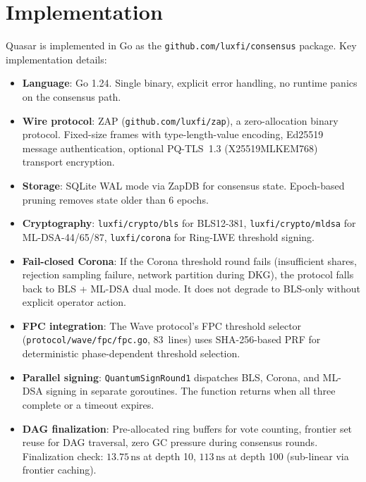 \section{Implementation}

\label{sec:implementation}

Quasar is implemented in Go as the \texttt{github.com/luxfi/consensus}
package. Key implementation details:

\begin{itemize}[leftmargin=2em]
\item \textbf{Language}: Go 1.24. Single binary, explicit error handling,
      no runtime panics on the consensus path.
\item \textbf{Wire protocol}: ZAP (\texttt{github.com/luxfi/zap}), a
      zero-allocation binary protocol. Fixed-size frames with type-length-value
      encoding, Ed25519 message authentication, optional PQ-TLS~1.3
      (X25519MLKEM768) transport encryption.
\item \textbf{Storage}: SQLite WAL mode via ZapDB for consensus state.
      Epoch-based pruning removes state older than 6 epochs.
\item \textbf{Cryptography}: \texttt{luxfi/crypto/bls} for BLS12-381,
      \texttt{luxfi/crypto/mldsa} for ML-DSA-44/65/87,
      \texttt{luxfi/corona} for Ring-LWE threshold signing.
\item \textbf{Fail-closed Corona}: If the Corona threshold round fails
      (insufficient shares, rejection sampling failure, network partition
      during DKG), the protocol falls back to BLS + ML-DSA dual mode.
      It does not degrade to BLS-only without explicit operator action.
\item \textbf{FPC integration}: The Wave protocol's FPC threshold selector
      (\texttt{protocol/wave/fpc/fpc.go}, 83~lines) uses SHA-256-based PRF
      for deterministic phase-dependent threshold selection.
\item \textbf{Parallel signing}: \texttt{QuantumSignRound1} dispatches BLS,
      Corona, and ML-DSA signing in separate goroutines. The function
      returns when all three complete or a timeout expires.
\item \textbf{DAG finalization}: Pre-allocated ring buffers for vote counting,
      frontier set reuse for DAG traversal, zero GC pressure during consensus
      rounds. Finalization check: $13.75\,\text{ns}$ at depth 10,
      $113\,\text{ns}$ at depth 100 (sub-linear via frontier caching).
\end{itemize}


